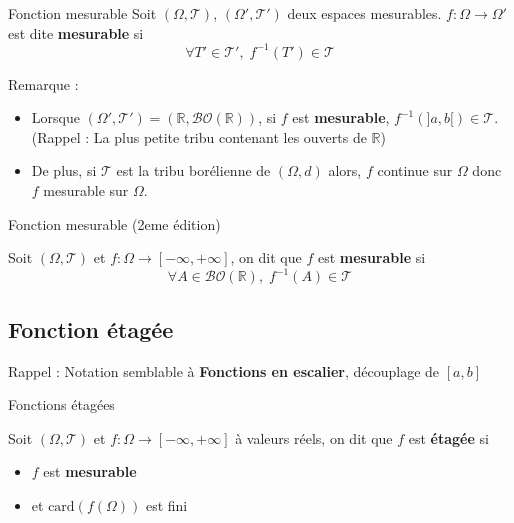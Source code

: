 \begin{Definition}[colbacktitle=red!75!black]{Fonction mesurable}{}
Soit $(\Omega, \mathcal{T})$, $(\Omega', \mathcal{T}')$ deux espaces mesurables. 
$f: \Omega \to \Omega'$ est dite \textbf{mesurable} si 
\begin{equation}
  \forall T' \in \mathcal{T} ', \; f ^{-1} (T') \in \mathcal{T}
\end{equation}
\end{Definition}

Remarque : 
\begin{itemize}

    \item Lorsque $(\Omega', \mathcal{T}')= (\mathbb{R}, \mathcal{BO}(\mathbb{R}))$, si $f$ est \textbf{mesurable}, $f ^{-1}(]a,b[) \in \mathcal{T}$. (Rappel : La plus petite tribu contenant les ouverts de $\mathbb{R}$)
    \item De plus, si $\mathcal{T}$ est la tribu borélienne de $(\Omega, d)$ alors, $f$ continue sur $\Omega$ donc $f$ mesurable sur $\Omega$.

\end{itemize}
\begin{Definition}[colbacktitle=red!75!black]{Fonction mesurable (2eme édition)}{}

  
Soit $(\Omega, \mathcal{T})$ et $f : \Omega \to [-\infty, + \infty]$, on dit que $f$ est \textbf{mesurable} si 
\begin{equation}
  \forall A \in \mathcal{BO}(\mathbb{R}),\; f ^{-1}(A) \in \mathcal{T}
\end{equation}
\end{Definition}

\subsection{Fonction étagée} %
\label{sub:Fonction étagée}

\begin{note}{}{}
  Rappel : Notation semblable à \textbf{Fonctions en escalier}, découplage de $[a,b]$
\end{note}
\begin{Definition}[colbacktitle=red!75!black]{Fonctions étagées}{}

Soit $(\Omega, \mathcal{T})$ et $f : \Omega \to [-\infty, + \infty]$ à valeurs réels, on dit que $f$ est \textbf{étagée} si 
\begin{itemize}

    \item $f$ est \textbf{mesurable}
    \item et $\mathrm{card}(f(\Omega))$ est fini

\end{itemize}
\end{Definition}

